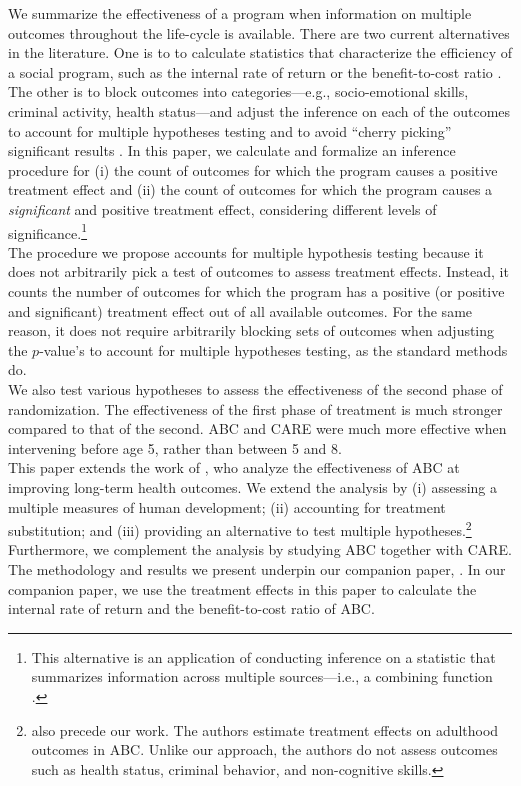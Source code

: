 \noindent We summarize the effectiveness of a program when information on multiple outcomes throughout the life-cycle is available. There are two current alternatives in the literature. One is to to calculate statistics that characterize the efficiency of a social program, such as the internal rate of return or the benefit-to-cost ratio \citep{Heckman_Moon_etal_2010_RateofReturn}. The other is to block outcomes into categories---e.g., socio-emotional skills, criminal activity, health status---and adjust the inference on each of the outcomes to account for multiple hypotheses testing and to avoid ``cherry picking'' significant results \citep{Lehman_Romano_2005_AnnStat,Lehmann_Romano_2005_testing,Heckman_Moon_etal_2010_QE}. In this paper, we calculate and formalize an inference procedure for (i) the count of outcomes for which the program causes a positive treatment effect and (ii) the count of outcomes for which the program causes a \emph{significant} and positive treatment effect, considering different levels of significance.\footnote{This alternative is an application of conducting inference on a statistic that summarizes information across multiple sources---i.e., a combining function \citep{Pesarin_Salmaso_2010_PermutationTests}.}\\

\noindent The procedure we propose accounts for multiple hypothesis testing because it does not arbitrarily pick a test of outcomes to assess treatment effects. Instead, it counts the number of outcomes for which the program has a positive (or positive and significant) treatment effect out of all available outcomes. For the same reason, it does not require arbitrarily blocking sets of outcomes when adjusting the $p$-value's to account for multiple hypotheses testing, as the standard methods do.\\

\noindent We also test various hypotheses to assess the effectiveness of the second phase of randomization. The effectiveness of the first phase of treatment is much stronger compared to that of the second. ABC and CARE were much more effective when intervening before age 5, rather than between 5 and 8.\\

\noindent This paper extends the work of \citet{Campbell_Conti_etal_2014_EarlyChildhoodInvestments}, who analyze the effectiveness of ABC at improving long-term health outcomes. We extend the analysis by (i) assessing a multiple measures of human development; (ii) accounting for treatment substitution; and (iii) providing an alternative to test multiple hypotheses.\footnote{\cite{Campbell_Pungello_etal_2012_DP} also precede our work. The authors estimate treatment effects on adulthood outcomes in ABC. Unlike our approach, the authors do not assess outcomes such as health status, criminal behavior, and non-cognitive skills.} Furthermore, we complement the analysis by studying ABC together with CARE. The methodology and results we present underpin our companion paper, \citet{Elango_et_al_2015_ABC_unpublished}. In our companion paper, we use the treatment effects in this paper to calculate the internal rate of return and the benefit-to-cost ratio of ABC.\\

